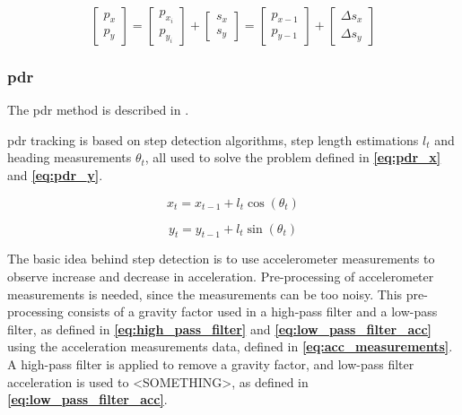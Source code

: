 \begin{equation} \label{eq:IMUPosition}
    \begin{bmatrix}p_{x} \\ p_{y}\end{bmatrix} = \begin{bmatrix}p_{x_{i}} \\ p_{y_{i}}\end{bmatrix} + \begin{bmatrix}s_{x} \\ s_{y}\end{bmatrix} = \begin{bmatrix}p_{x - 1} \\ p_{y - 1}\end{bmatrix} + \begin{bmatrix}\Delta s_{x} \\ \Delta s_{y}\end{bmatrix}
\end{equation}

\subsubsection{\gls{pdr}}
The \gls{pdr} method is described in \cite{HybridPositioningPaper}.

\gls{pdr} tracking is based on step detection algorithms, step length estimations $l_t$ and heading measurements $\theta_t$, all used to solve the problem defined in \textbf{\autoref{eq:pdr_x}} and \textbf{\autoref{eq:pdr_y}}.

\begin{equation} \label{eq:pdr_x}
    x_t = x_{t - 1} + l_t\cos(\theta_t)
\end{equation}

\begin{equation} \label{eq:pdr_y}
    y_t = y_{t - 1} + l_t\sin(\theta_t)
\end{equation}

The basic idea behind step detection is to use accelerometer measurements to observe increase and decrease in acceleration.
Pre-processing of accelerometer measurements is needed, since the measurements can be too noisy. This pre-processing consists of a gravity factor used in a high-pass filter and a low-pass filter, as defined in \textbf{\autoref{eq:high_pass_filter}} and \textbf{\autoref{eq:low_pass_filter_acc}} using the acceleration measurements data, defined in \textbf{\autoref{eq:acc_measurements}}. A high-pass filter is applied to remove a gravity factor, and low-pass filter acceleration is used to <SOMETHING>, as defined in \textbf{\autoref{eq:low_pass_filter_acc}}.

